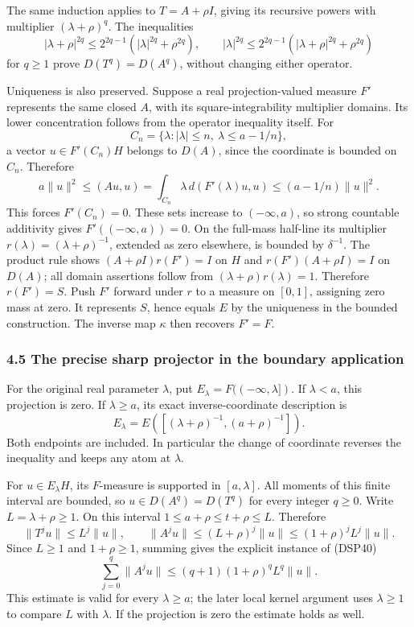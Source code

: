 \documentclass[
  11pt,
]{article}
\begin{document}
The same induction applies to \(T=A+\rho I\), giving its recursive
powers with multiplier \((\lambda+\rho)^q\). The inequalities \[
 |\lambda+\rho|^{2q}\leq 2^{2q-1}(|\lambda|^{2q}+\rho^{2q}),
 \qquad
 |\lambda|^{2q}\leq 2^{2q-1}(|\lambda+\rho|^{2q}+\rho^{2q})
\] for \(q\geq1\) prove \(D(T^q)=D(A^q)\), without changing either
operator.

Uniqueness is also preserved. Suppose a real projection-valued measure
\(F'\) represents the same closed \(A\), with its square-integrability
multiplier domains. Its lower concentration follows from the operator
inequality itself. For \[
 C_n=\{\lambda:|\lambda|\leq n,\ \lambda\leq a-1/n\},
\] a vector \(u\in F'(C_n)H\) belongs to \(D(A)\), since the coordinate
is bounded on \(C_n\). Therefore \[
 a\|u\|^2\leq(Au,u)
  =\int_{C_n}\lambda\,d(F'(\lambda)u,u)
  \leq(a-1/n)\|u\|^2.
\] This forces \(F'(C_n)=0\). These sets increase to \((-\infty,a)\), so
strong countable additivity gives \(F'((-\infty,a))=0\). On the
full-mass half-line its multiplier \(r(\lambda)=(\lambda+\rho)^{-1}\),
extended as zero elsewhere, is bounded by \(\delta^{-1}\). The product
rule shows \((A+\rho I)r(F')=I\) on \(H\) and \(r(F')(A+\rho I)=I\) on
\(D(A)\); all domain assertions follow from
\((\lambda+\rho)r(\lambda)=1\). Therefore \(r(F')=S\). Push \(F'\)
forward under \(r\) to a measure on \([0,1]\), assigning zero mass at
zero. It represents \(S\), hence equals \(E\) by the uniqueness in the
bounded construction. The inverse map \(\kappa\) then recovers \(F'=F\).

\subsubsection{4.5 The precise sharp projector in the boundary
application}\label{the-precise-sharp-projector-in-the-boundary-application}

For the original real parameter \(\lambda\), put
\(E_\lambda=F((-\infty,\lambda])\). If \(\lambda<a\), this projection is
zero. If \(\lambda\geq a\), its exact inverse-coordinate description is
\[
 E_\lambda
 =E\!\left([(\lambda+\rho)^{-1},(a+\rho)^{-1}]\right).
 \tag{LB17}
\] Both endpoints are included. In particular the change of coordinate
reverses the inequality and keeps any atom at \(\lambda\).

For \(u\in E_\lambda H\), its \(F\)-measure is supported in
\([a,\lambda]\). All moments of this finite interval are bounded, so
\(u\in D(A^q)=D(T^q)\) for every integer \(q\geq0\). Write
\(L=\lambda+\rho\geq1\). On this interval
\(1\leq a+\rho\leq t+\rho\leq L\). Therefore \[
 \|T^ju\|\leq L^j\|u\|,\qquad
 \|A^ju\|\leq (L+\rho)^j\|u\|
             \leq(1+\rho)^jL^j\|u\|.
 \tag{LB18}
\] Since \(L\geq1\) and \(1+\rho\geq1\), summing gives the explicit
instance of (DSP40) \[
 \sum_{j=0}^q\|A^ju\|
 \leq(q+1)(1+\rho)^qL^q\|u\|.
 \tag{LB19}
\] This estimate is valid for every \(\lambda\geq a\); the later local
kernel argument uses \(\lambda\geq1\) to compare \(L\) with \(\lambda\).
If the projection is zero the estimate holds as well.
\end{document}
